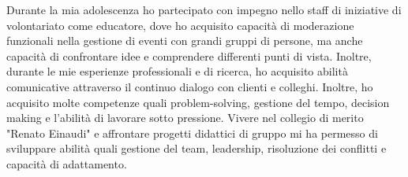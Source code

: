 {\begin{cvskills}


\end{cvskills}
\vspace{-5mm}
\begin{cvparagraph}
  Durante la mia adolescenza ho partecipato con impegno nello staff di iniziative di volontariato come educatore, dove ho acquisito capacità di moderazione funzionali nella gestione di eventi con grandi gruppi di persone, ma anche capacità di confrontare idee e comprendere differenti punti di vista. Inoltre, durante le mie esperienze professionali e di ricerca, ho acquisito abilità comunicative attraverso il continuo dialogo con clienti e colleghi. 
  Inoltre, ho acquisito molte competenze quali problem-solving, gestione del tempo, decision making e l'abilità di lavorare sotto pressione. Vivere nel collegio di merito "Renato Einaudi" e affrontare progetti didattici di gruppo mi ha permesso di sviluppare abilità quali gestione del team, leadership, risoluzione dei conflitti e capacità di adattamento.
\end{cvparagraph}
}